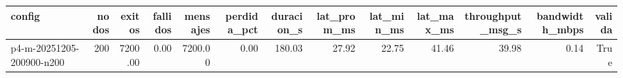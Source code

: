 \begin{tabular}{lrrrrrrrrrrrr}
\toprule
config & nodos & exitos & fallidos & mensajes & perdida_pct & duracion_s & lat_prom_ms & lat_min_ms & lat_max_ms & throughput_msg_s & bandwidth_mbps & valida \\
\midrule
p4-m-20251205-200900-n200 & 200 & 7200.00 & 0.00 & 7200.00 & 0.00 & 180.03 & 27.92 & 22.75 & 41.46 & 39.98 & 0.14 & True \\
\bottomrule
\end{tabular}
